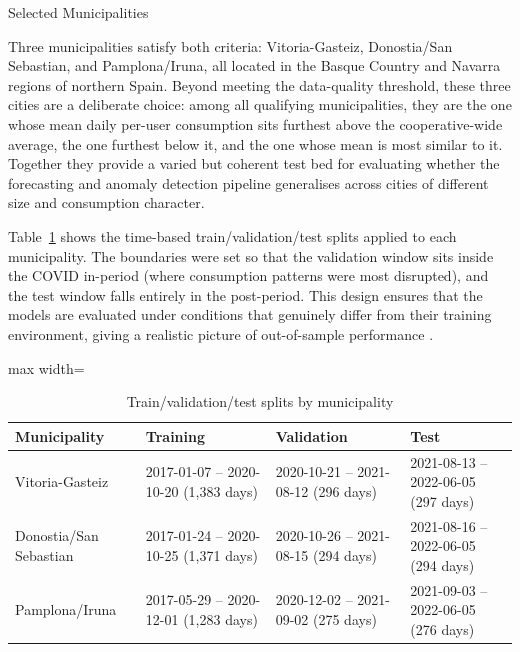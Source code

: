 ﻿\documentclass[12pt,reqno, twoside]{amsbook}
\makeatletter
\numberwithin{figure}{chapter}
\numberwithin{table}{chapter}
\numberwithin{equation}{chapter}
\def\subsection{\@startsection{subsection}{2}%
      \z@{.5\linespacing\@plus.7\linespacing}{.25\linespacing}%
      {\normalfont\bfseries\flushleft}}
\theoremstyle{plain}
\numberwithin{equation}{chapter}
\numberwithin{section}{chapter}
\makeatother
\begin{document}
\subsection{Selected Municipalities}

Three municipalities satisfy both criteria: Vitoria-Gasteiz, Donostia/San Sebastian, and Pamplona/Iruna, all located in the Basque Country and Navarra regions of northern Spain. Beyond meeting the data-quality threshold, these three cities are a deliberate choice: among all qualifying municipalities, they are the one whose mean daily per-user consumption sits furthest above the cooperative-wide average, the one furthest below it, and the one whose mean is most similar to it. Together they provide a varied but coherent test bed for evaluating whether the forecasting and anomaly detection pipeline generalises across cities of different size and consumption character.

Table~\ref{tab:municipality_splits} shows the time-based train/validation/test splits applied to each municipality. The boundaries were set so that the validation window sits inside the COVID in-period (where consumption patterns were most disrupted), and the test window falls entirely in the post-period. This design ensures that the models are evaluated under conditions that genuinely differ from their training environment, giving a realistic picture of out-of-sample performance \cite{hernandez_detection_2024}.

\begin{table}[htbp]
\centering
\caption{Train/validation/test splits by municipality}
\label{tab:municipality_splits}
\begin{adjustbox}{max width=\textwidth}
\begin{tabular}{lp{3.5cm}p{3.5cm}p{3.5cm}}
\toprule
\textbf{Municipality} & \textbf{Training} & \textbf{Validation} & \textbf{Test} \\
\midrule
Vitoria-Gasteiz
  & 2017-01-07 -- 2020-10-20 \newline (1{,}383 days)
  & 2020-10-21 -- 2021-08-12 \newline (296 days)
  & 2021-08-13 -- 2022-06-05 \newline (297 days) \\
\addlinespace
Donostia/San Sebastian
  & 2017-01-24 -- 2020-10-25 \newline (1{,}371 days)
  & 2020-10-26 -- 2021-08-15 \newline (294 days)
  & 2021-08-16 -- 2022-06-05 \newline (294 days) \\
\addlinespace
Pamplona/Iruna
  & 2017-05-29 -- 2020-12-01 \newline (1{,}283 days)
  & 2020-12-02 -- 2021-09-02 \newline (275 days)
  & 2021-09-03 -- 2022-06-05 \newline (276 days) \\
\bottomrule
\end{tabular}
\end{adjustbox}
\end{table}
\end{document}
